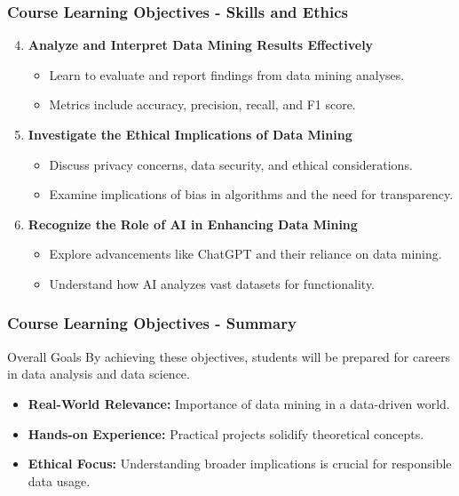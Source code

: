 \documentclass[aspectratio=169]{beamer}
\begin{document}
\begin{frame}[fragile]
    \frametitle{Course Learning Objectives - Skills and Ethics}
    \begin{enumerate}\setcounter{enumi}{3}
        \item \textbf{Analyze and Interpret Data Mining Results Effectively}
        \begin{itemize}
            \item Learn to evaluate and report findings from data mining analyses.
            \item Metrics include accuracy, precision, recall, and F1 score.
        \end{itemize}
        
        \item \textbf{Investigate the Ethical Implications of Data Mining}
        \begin{itemize}
            \item Discuss privacy concerns, data security, and ethical considerations.
            \item Examine implications of bias in algorithms and the need for transparency.
        \end{itemize}
        
        \item \textbf{Recognize the Role of AI in Enhancing Data Mining}
        \begin{itemize}
            \item Explore advancements like ChatGPT and their reliance on data mining.
            \item Understand how AI analyzes vast datasets for functionality.
        \end{itemize}
    \end{enumerate}
\end{frame}

\begin{frame}[fragile]
    \frametitle{Course Learning Objectives - Summary}
    \begin{block}{Overall Goals}
        By achieving these objectives, students will be prepared for careers in data analysis and data science.
    \end{block}

    \begin{itemize}
        \item \textbf{Real-World Relevance:} Importance of data mining in a data-driven world.
        \item \textbf{Hands-on Experience:} Practical projects solidify theoretical concepts.
        \item \textbf{Ethical Focus:} Understanding broader implications is crucial for responsible data usage.
    \end{itemize}
\end{frame}
\end{document}
